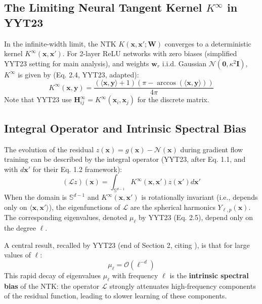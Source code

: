 \documentclass{article}
\begin{document}
\subsection{The Limiting Neural Tangent Kernel $K^{\infty}$ in YYT23}
In the infinite-width limit, the NTK $K(\mathbf{x}, \mathbf{x}'; \mathbf{W})$ converges to a deterministic kernel $K^{\infty}(\mathbf{x}, \mathbf{x}')$. For 2-layer ReLU networks with zero biases (simplified YYT23 setting for main analysis), and weights $\mathbf{w}_r$ i.i.d. Gaussian $\mathcal{N}(\mathbf{0}, \kappa^2 \mathbf{I})$, $K^{\infty}$ is given by (Eq. 2.4, YYT23, adapted):
\begin{equation}
    K^{\infty}(\mathbf{x}, \mathbf{y}) = \frac{(\langle \mathbf{x}, \mathbf{y} \rangle + 1) (\pi - \arccos(\langle \mathbf{x}, \mathbf{y} \rangle))}{4\pi}
    \label{eq:Kinf_YYT23}
\end{equation}
Note that YYT23 use $\mathbf{H}^\infty_{ij} = K^{\infty}(\mathbf{x}_i, \mathbf{x}_j)$ for the discrete matrix.

\subsection{Integral Operator and Intrinsic Spectral Bias}
The evolution of the residual $z(\mathbf{x}) = g(\mathbf{x}) - \mathcal{N}(\mathbf{x})$ during gradient flow training can be described by the integral operator (YYT23, after Eq. 1.1, and with $d\mathbf{x}'$ for their Eq. 1.2 framework):
\begin{equation}
    (\mathcal{L} z)(\mathbf{x}) = \int_{\mathbb{S}^{d-1}} K^{\infty}(\mathbf{x}, \mathbf{x}') z(\mathbf{x}') d\mathbf{x}'
\end{equation}
When the domain is $\mathbb{S}^{d-1}$ and $K^{\infty}(\mathbf{x}, \mathbf{x}')$ is rotationally invariant (i.e., depends only on $\langle \mathbf{x}, \mathbf{x}' \rangle$), the eigenfunctions of $\mathcal{L}$ are the spherical harmonics $Y_{\ell,p}(\mathbf{x})$. The corresponding eigenvalues, denoted $\mu_\ell$ by YYT23 (Eq. 2.5), depend only on the degree $\ell$.

A central result, recalled by YYT23 (end of Section 2, citing \cite{basri2020frequency, bietti2019inductive}), is that for large values of $\ell$:
\begin{equation}
    \mu_\ell = \mathcal{O}(\ell^{-d})
    \label{eq:mu_ell_decay}
\end{equation}
This rapid decay of eigenvalues $\mu_\ell$ with frequency $\ell$ is the \textbf{intrinsic spectral bias} of the NTK: the operator $\mathcal{L}$ strongly attenuates high-frequency components of the residual function, leading to slower learning of these components.
\end{document}
